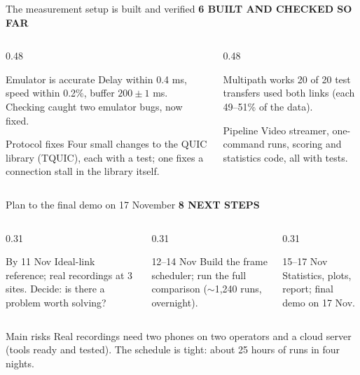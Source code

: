 \documentclass[aspectratio=169,11pt]{beamer}
\newcommand{\eyebrow}[1]{{\color{accent}\footnotesize\bfseries\MakeUppercase{#1}}\par\smallskip}
\begin{document}
\begin{frame}{The measurement setup is built and verified}
  \eyebrow{6 \textperiodcentered{} Built and checked so far}
  \begin{columns}[T]
    \begin{column}{0.48\textwidth}
      \begin{block}{Emulator is accurate}
        Delay within 0.4 ms, speed within 0.2\%, buffer $200 \pm 1$ ms. Checking caught two emulator bugs, now fixed.
      \end{block}
      \begin{block}{Protocol fixes}
        Four small changes to the QUIC library (TQUIC), each with a test; one fixes a connection stall in the library itself.
      \end{block}
    \end{column}
    \begin{column}{0.48\textwidth}
      \begin{block}{Multipath works}
        20 of 20 test transfers used both links (each 49--51\% of the data).
      \end{block}
      \begin{block}{Pipeline}
        Video streamer, one-command runs, scoring and statistics code, all with tests.
      \end{block}
    \end{column}
  \end{columns}
\end{frame}

\begin{frame}{Plan to the final demo on 17 November}
  \eyebrow{8 \textperiodcentered{} Next steps}
  \begin{columns}[T]
    \begin{column}{0.31\textwidth}
      \begin{block}{By 11 Nov}
        Ideal-link reference; real recordings at 3 sites. Decide: is there a problem worth solving?
      \end{block}
    \end{column}
    \begin{column}{0.31\textwidth}
      \begin{block}{12--14 Nov}
        Build the frame scheduler; run the full comparison ($\sim$1,240 runs, overnight).
      \end{block}
    \end{column}
    \begin{column}{0.31\textwidth}
      \begin{block}{15--17 Nov}
        Statistics, plots, report; final demo on 17 Nov.
      \end{block}
    \end{column}
  \end{columns}
  \medskip
  \begin{alertblock}{Main risks}
    Real recordings need two phones on two operators and a cloud server (tools ready and tested). The schedule is tight: about 25 hours of runs in four nights.
  \end{alertblock}
\end{frame}
\end{document}
